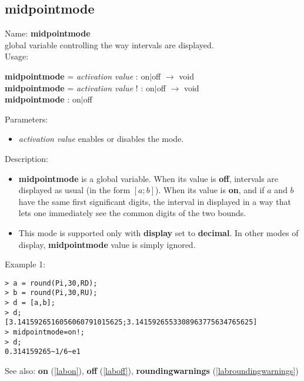 \subsection{midpointmode}
\label{labmidpointmode}
\noindent Name: \textbf{midpointmode}\\
global variable controlling the way intervals are displayed.\\
\noindent Usage: 
\begin{center}
\textbf{midpointmode} = \emph{activation value} : \textsf{on$|$off} $\rightarrow$ \textsf{void}\\
\textbf{midpointmode} = \emph{activation value} ! : \textsf{on$|$off} $\rightarrow$ \textsf{void}\\
\textbf{midpointmode} : \textsf{on$|$off}\\
\end{center}
Parameters: 
\begin{itemize}
\item \emph{activation value} enables or disables the mode.
\end{itemize}
\noindent Description: \begin{itemize}

\item \textbf{midpointmode} is a global variable. When its value is \textbf{off}, intervals are displayed
   as usual (in the form $\left[ a;b\right]$).
   When its value is \textbf{on}, and if $a$ and $b$ have the same first significant digits,
   the interval in displayed in a way that lets one immediately see the common
   digits of the two bounds.

\item This mode is supported only with \textbf{display} set to \textbf{decimal}. In other modes of 
   display, \textbf{midpointmode} value is simply ignored.
\end{itemize}
\noindent Example 1: 
\begin{center}\begin{minipage}{15cm}\begin{Verbatim}[frame=single]
> a = round(Pi,30,RD);
> b = round(Pi,30,RU);
> d = [a,b];
> d;
[3.1415926516056060791015625;3.1415926553308963775634765625]
> midpointmode=on!;
> d;
0.314159265~1/6~e1
\end{Verbatim}
\end{minipage}\end{center}
See also: \textbf{on} (\ref{labon}), \textbf{off} (\ref{laboff}), \textbf{roundingwarnings} (\ref{labroundingwarnings})

